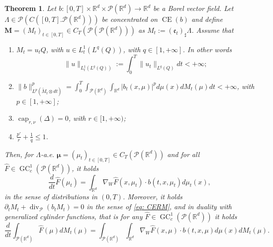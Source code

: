 \documentclass[10pt,leqno]{amsart}
\numberwithin{equation}{section}
\newtheorem{teorema}{Theorem}[section]
\newcommand{\R}{\mathbb{R}}
\newcommand{\Q}{\mathbb{Q}}
\newcommand{\PP}{\mathcal{P}}
\renewcommand{\Q}{Q}
\begin{document}
\begin{teorema}\label{superposition in duality with gen cyl functions}
    Let $b:[0,T]\times \R^d \times \PP(\R^d)\to \R^d$ be a Borel vector field. Let $\Lambda\in \PP(C([0,T].\PP(\R^d)))$ be concentrated on $\operatorname{CE}(b)$ and define $\boldsymbol{M}=(M_t)_{t\in[0,T]}\in C_T(\PP(\PP(\R^d)))$ as $M_t := (\mathfrak{e}_t)_\sharp \Lambda$. Assume that 
    \begin{enumerate}
        \item $M_t = u_t \Q$, with $u \in L^1_t(L^q(\Q))$, with $q\in[1,+\infty]$. In other words 
        \begin{equation}
           \|u\|_{L^1_t(L^q(\Q))}:= \int_0^T \|u_t\|_{L^{q}(\Q)} dt <+\infty;
        \end{equation}
        \item $\|b\|_{L^p(\widetilde{M}_t\otimes dt)}^p=\int_0^T \int_{\PP(\R^d)} \int_{\R^d} |b_t(x,\mu)|^p d\mu(x) dM_t(\mu) dt<+\infty$, with $p\in[1,+\infty]$;
        \item $\operatorname{cap}_{r,\nu}(\Delta) = 0$, with $r\in [1,+\infty)$;
        \item $\frac{p'}{r}+\frac{1}{q}\leq1$.
    \end{enumerate}
    Then, for $\Lambda$-a.e. $\boldsymbol{\mu}= (\mu_t)_{t\in [0,T]} \in C_T(\PP(\R^d))$ and for all $\hat{F}\in \operatorname{GC}_c^1(\PP(\R^d))$, it holds
    \begin{equation}\label{eq: non-local CE in dual with GC}
        \frac{d}{dt} \hat{F}(\mu_t) = \int_{\R^d} \nabla_W\hat{F}(x,\mu_t) \cdot  b(t,x,\mu_t) d\mu_t(x),
    \end{equation}
    in the sense of distributions in $(0,T)$.
    Moreover, it holds $\partial_t M_t + \operatorname{div}_\PP(b_tM_t) = 0$ in the sense of \eqref{eq: CERM}, and in duality with generalized cylinder functions, that is for any $\hat{F}\in \operatorname{GC}_c^1(\PP(\R^d))$ it holds 
    \begin{equation}\label{eq: CERM in dual with GC}
        \frac{d}{dt}\int_{\PP(\R^d)} \hat{F}(\mu) dM_t(\mu) = \int_{\PP(\R^d)} \int_{\R^d} \nabla_W\hat{F}(x,\mu) \cdot  b(t,x,\mu) d\mu(x) dM_t(\mu).
    \end{equation}
\end{teorema}
\end{document}
